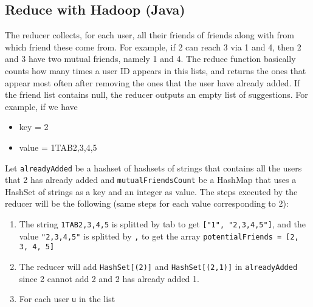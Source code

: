 \documentclass[11pt]{article}
\begin{document}
\begin{justifying}
\section{Reduce with Hadoop (Java)}
The reducer collects, for each user, all their friends of friends along with from which friend these come from. For example, if 2 can reach 3 via 1 and 4, then 2 and 3 have two mutual friends, namely 1 and 4. The reduce function basically counts how many times a user ID appears in this lists, and returns the ones that appear most often after removing the ones that the user have already added. If the friend list contains null, the reducer outputs an empty list of suggestions. For example, if we have
\begin{itemize}
    \item key \space \space \space = 2
    \item value = 1TAB2,3,4,5
\end{itemize}
Let \verb|alreadyAdded| be a hashset of hashsets of strings that contains all the users that 2 has already added and \verb|mutualFriendsCount| be a HashMap that uses a HashSet of strings as a key and an integer as value. The steps executed by the reducer will be the following (same steps for each value corresponding to 2):
\begin{enumerate}
    \item The string \verb|1TAB2,3,4,5| is splitted by tab to get \verb|["1", "2,3,4,5"]|, and the value \verb|"2,3,4,5"| is splitted by \verb|,| to get the array \verb|potentialFriends = [2, 3, 4, 5]|
    \item The reducer will add \verb|HashSet[(2)]| and \verb|HashSet[(2,1)]| in \verb|alreadyAdded| since 2 cannot add 2 and 2 has already added 1.
    \item  For each user \verb|u| in the list 
\end{enumerate}

\end{justifying}
\end{document}
